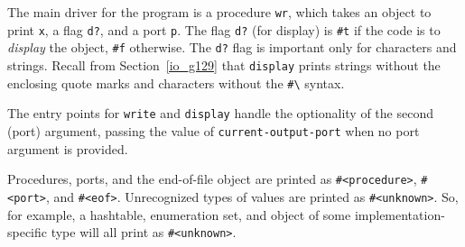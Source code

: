 The main driver for the program is a procedure \texttt{wr}, which takes
an object to print \texttt{x}, a flag \texttt{d?}, and a port \texttt{p}.
The flag \texttt{d?} (for display) is \texttt{\#{}t} if the code is to
\textit{display} the object, \texttt{\#{}f} otherwise.
The \texttt{d?} flag is important only for characters and strings.
Recall from Section \ref{io_g129} that \texttt{display} prints strings
without the enclosing quote marks and characters without the
\texttt{\#{}\textbackslash{}} syntax.


The entry points for \texttt{write} and \texttt{display} handle the optionality of
the second (port) argument, passing the value of
\texttt{current-output-port} when no port argument is provided.


Procedures, ports, and the end-of-file object are printed as
\texttt{\#{}\textless{}procedure\textgreater{}}, \texttt{\#{}\textless{}port\textgreater{}}, and \texttt{\#{}\textless{}eof\textgreater{}}.
Unrecognized types of values are printed as \texttt{\#{}\textless{}unknown\textgreater{}}.
So, for example, a hashtable, enumeration set, and object of
some implementation-specific type will all print as \texttt{\#{}\textless{}unknown\textgreater{}}.


